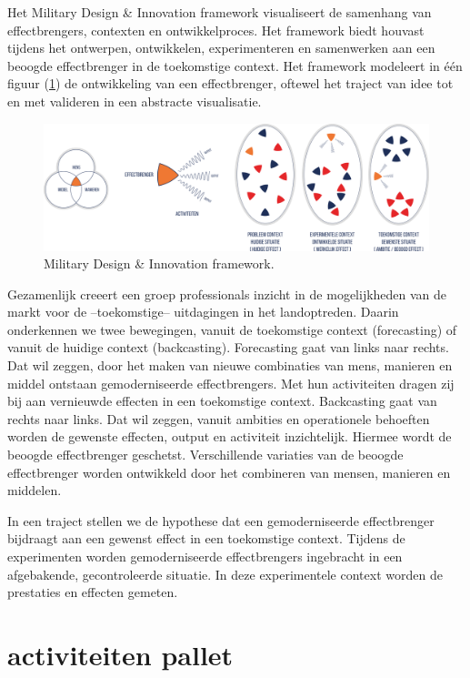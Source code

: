 \documentclass[
]{book}
\begin{document}
Het Military Design \& Innovation framework visualiseert de samenhang van effectbrengers, contexten en ontwikkelproces. Het framework biedt houvast tijdens het ontwerpen, ontwikkelen, experimenteren en samenwerken aan een beoogde effectbrenger in de toekomstige context. Het framework modeleert in één figuur (\ref{fig:design-model}) de ontwikkeling van een effectbrenger, oftewel het traject van idee tot en met valideren in een abstracte visualisatie.

\begin{figure}

{\centering \includegraphics[width=0.5\linewidth]{data/images/20210324-MDI-design-model} 

}

\caption{Military Design \& Innovation framework.}\label{fig:design-model}
\end{figure}

Gezamenlijk creeert een groep professionals inzicht in de mogelijkheden van de markt voor de --toekomstige-- uitdagingen in het landoptreden. Daarin onderkennen we twee bewegingen, vanuit de toekomstige context (forecasting) of vanuit de huidige context (backcasting).
Forecasting gaat van links naar rechts. Dat wil zeggen, door het maken van nieuwe combinaties van mens, manieren en middel ontstaan gemoderniseerde effectbrengers. Met hun activiteiten dragen zij bij aan vernieuwde effecten in een toekomstige context.
Backcasting gaat van rechts naar links. Dat wil zeggen, vanuit ambities en operationele behoeften worden de gewenste effecten, output en activiteit inzichtelijk. Hiermee wordt de beoogde effectbrenger geschetst. Verschillende variaties van de beoogde effectbrenger worden ontwikkeld door het combineren van mensen, manieren en middelen.

In een traject stellen we de hypothese dat een gemoderniseerde effectbrenger bijdraagt aan een gewenst effect in een toekomstige context. Tijdens de experimenten worden gemoderniseerde effectbrengers ingebracht in een afgebakende, gecontroleerde situatie. In deze experimentele context worden de prestaties en effecten gemeten.

\hypertarget{activiteiten-pallet}{%
\section{activiteiten pallet}\label{activiteiten-pallet}}
\end{document}

